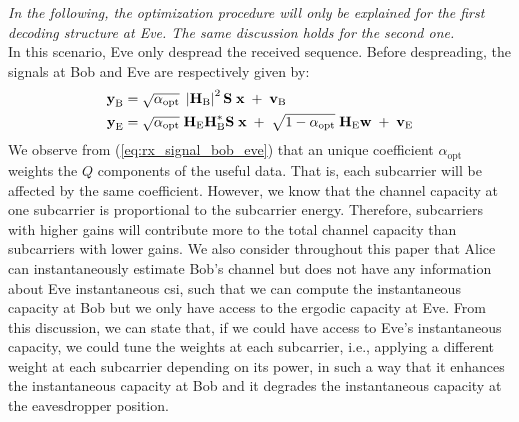 \textit{In the following, the optimization procedure will only be explained for the first decoding structure at Eve. The same discussion holds for the second one.}\\

In this scenario, Eve only despread the received sequence. Before despreading, the signals at Bob and Eve are respectively given by:
\begin{equation}
    \begin{split}
        \textbf{y}_{\text{B}} &= \sqrt{\alpha_{\text{opt}}} \; \left|\textbf{H}_{\text{B}}\right|^2 \textbf{S}\; \textbf{x} \; +  \;  \textbf{v}_{\text{B}} \\
        \textbf{y}_{\text{E}} &= \sqrt{\alpha_{\text{opt}}} \; \textbf{H}_{\text{E}} \textbf{H}^*_{\text{B}} \textbf{S}\; \textbf{x} \; +  \; \sqrt{1-\alpha_{\text{opt}}} \; \textbf{H}_{\text{E}} \textbf{w}  \; +  \;  \textbf{v}_{\text{E}}
    \end{split}
    \label{eq:rx_signal_bob_eve}
\end{equation}
We observe from (\ref{eq:rx_signal_bob_eve}) that an unique coefficient $\alpha_{\text{opt}}$ weights the $Q$ components of the useful data. That is, each subcarrier will be affected by the same coefficient. However, we know that the channel capacity at one subcarrier is proportional to the subcarrier energy. Therefore, subcarriers with higher gains will contribute more to the total channel capacity than subcarriers with lower gains. We also consider throughout this paper that Alice can instantaneously estimate Bob's channel but does not have any information about Eve instantaneous \gls{csi}, such that we can compute the instantaneous capacity at Bob but we only have access to the ergodic capacity at Eve. From this discussion, we can state that, if we could have access to Eve's instantaneous capacity, we could tune the weights at each subcarrier, i.e., applying a different weight at each subcarrier depending on its power, in such a way that it enhances the instantaneous capacity at Bob and it degrades the instantaneous capacity at the eavesdropper position. \\


